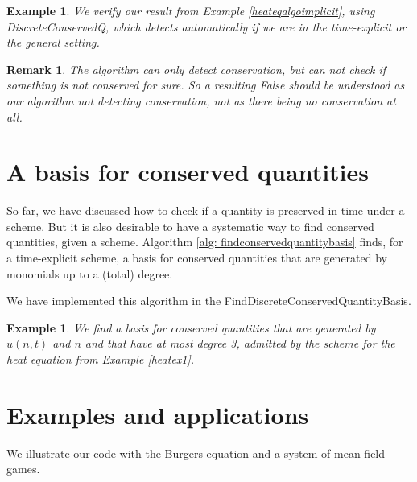 \documentclass[sigconf,twocolumn]{acmart}
\newcommand{\1}{{\chi}}
\numberwithin{equation}{section}
\theoremstyle{thmlemcorr}
\numberwithin{theorem}{section}
\theoremstyle{thmlemcorr*}
\theoremstyle{defi}
\theoremstyle{remexample}
\newtheorem{remark}[theorem]{Remark}
\newtheorem{example}[theorem]{Example}
\theoremstyle{ass}
\begin{document}
	\begin{example}
		We verify our result from Example \ref{heateqalgoimplicit}, using {\sc DiscreteConservedQ}, which detects automatically if we are in the time-explicit or the general setting.
		
		\begin{small}
		
		
		\end{small}
	\end{example}
\begin{remark}
	The algorithm can only detect conservation, but can not check if something is not conserved for sure. So a resulting {\sc False} should be understood as our algorithm not detecting conservation, not as there being no conservation at all.
\end{remark}
\section{A basis for conserved quantities}
\label{bfcq}
So far, we have discussed how to check if a quantity is preserved in time under a scheme. But it is also desirable to have a systematic way to find conserved quantities, given a scheme.
Algorithm \ref{alg: findconservedquantitybasis} finds, for a time-explicit scheme, a basis for conserved quantities that are generated by monomials up to a (total) degree. 

We have implemented this algorithm in the {\sc FindDiscreteConservedQuantityBasis}.
\begin{example}
	We find a basis for conserved quantities that are generated by $u(n,t)$ and $n$ and that have at most degree 3, admitted by the scheme for the heat equation from Example \ref{heatex1}.
	
	\begin{small}
		
		
	\end{small}
\end{example}
\section{Examples and applications}
\label{eaa}
We illustrate our code with the Burgers equation and a system of mean-field games.
\end{document}
